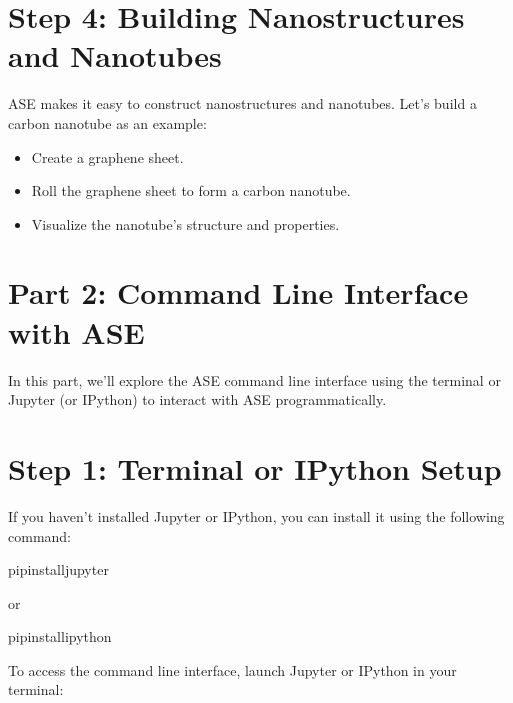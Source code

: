 \documentclass[letterpaper,10pt,english]{sphinxmanual}
\begin{document}
\section{Step 4: Building Nanostructures and Nanotubes}
\label{\detokenize{asebasics/asebasics:step-4-building-nanostructures-and-nanotubes}}
\sphinxAtStartPar
ASE makes it easy to construct nanostructures and nanotubes. Let’s build a carbon nanotube as an example:
\begin{itemize}
\item {} 
\sphinxAtStartPar
Create a graphene sheet.

\item {} 
\sphinxAtStartPar
Roll the graphene sheet to form a carbon nanotube.

\item {} 
\sphinxAtStartPar
Visualize the nanotube’s structure and properties.

\end{itemize}


\section{Part 2: Command Line Interface with ASE}
\label{\detokenize{asebasics/asebasics:part-2-command-line-interface-with-ase}}
\sphinxAtStartPar
In this part, we’ll explore the ASE command line interface using the terminal or Jupyter (or IPython) to interact with ASE programmatically.


\section{Step 1: Terminal or IPython Setup}
\label{\detokenize{asebasics/asebasics:step-1-terminal-or-ipython-setup}}
\sphinxAtStartPar
If you haven’t installed Jupyter or IPython, you can install it using the following command:

\begin{sphinxVerbatim}[commandchars=\\\{\}]
pipinstalljupyter
\end{sphinxVerbatim}

\sphinxAtStartPar
or

\begin{sphinxVerbatim}[commandchars=\\\{\}]
pipinstallipython
\end{sphinxVerbatim}

\sphinxAtStartPar
To access the command line interface, launch Jupyter or IPython in your terminal:
\end{document}
